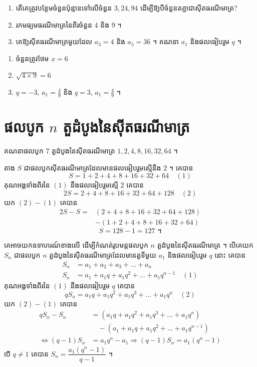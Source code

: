 \begin{pro}
\begin{enumerate}[a]
  \item តើគេត្រូវបន្ថែមចំនួនប៉ុន្មានទៅលើចំនួន $3, 24, 94$ ដើម្បីឱ្យបីចំនួនតគ្នាជាស៊ីតធរណីមាត្រ?
  \item រកមធ្យមធរណីមាត្រនៃពីរចំនួន $4$ និង $9$ ។
  \item គេឱ្យស៊ីតធរណីមាត្រមួយដែល $a_3 = 4$ និង $a_5 = 36$ ។ គណនា $a_1$ និងផលធៀបរួម $q$ ។
\end{enumerate}
\ans
\begin{enumerate}[a]
  \item ចំនួនត្រូវថែម $x = 6$
  \item $\sqrt{4 \times 9} = 6$
  \item $q = -3$, $a_1 = \frac{4}{9}$ និង $q = 3$, $a_1 = \frac{4}{9}$ ។
\end{enumerate}
\end{pro}

\section{ផលបូក \texorpdfstring{$n$}{n} តួដំបូងនៃស៊ីតធរណីមាត្រ}

\begin{example}[ឧទាហរណ៍]
គណនាផលបូក $7$ តួដំបូងនៃស៊ីតធរណីមាត្រ $1, 2, 4, 8, 16, 32, 64$ ។

តាង $S$ ជាផលបូកស៊ីតធរណីមាត្រដែលមានផលធៀបរួមស្មើនឹង $2$ ។ គេបាន
\[ S = 1 + 2 + 4 + 8 + 16 + 32 + 64 \quad (1) \]
គុណអង្គទាំងពីរនៃ $(1)$ នឹងផលធៀបរួមស្មើ $2$ គេបាន
\[ 2S = 2 + 4 + 8 + 16 + 32 + 64 + 128 \quad (2) \]
យក $(2) - (1)$ គេបាន
\[ \begin{aligned} 2S - S = {}&(2 + 4 + 8 + 16 + 32 + 64 + 128)\\ &- (1 + 2 + 4 + 8 + 16 + 32 + 64) \end{aligned} \]
\[ S = 128 - 1 = 127 \text{ ។} \]
\end{example}

គេអាចយកឧទាហរណ៍ខាងលើ ដើម្បីកំណត់រូបមន្តផលបូក $n$ តួដំបូងនៃស៊ីតធរណីមាត្រ ។ បើគេយក $S_n$ ជាផលបូក $n$ តួដំបូងនៃស៊ីតធរណីមាត្រដែលមានតួទីមួយ $a_1$ និងផលធៀបរួម $q$ នោះ គេបាន
\[
\begin{aligned}
S_n &= a_1 + a_2 + a_3 + \ldots + a_n\\
S_n &= a_1 + a_1 q + a_1 q^2 + \ldots + a_1 q^{n-1} \quad (1)
\end{aligned}
\]
គុណអង្គទាំងពីរនៃ $(1)$ នឹងផលធៀបរួម $q$ គេបាន
\[ qS_n = a_1 q + a_1 q^2 + a_1 q^3 + \ldots + a_1 q^n \quad (2) \]
យក $(2) - (1)$ គេបាន
\[
\begin{aligned}
qS_n - S_n &= (a_1 q + a_1 q^2 + a_1 q^3 + \ldots + a_1 q^n)\\ &\quad - (a_1 + a_1 q + a_1 q^2 + \ldots + a_1 q^{n-1})\\
\iff (q - 1)S_n &= a_1 q^n - a_1 \Rightarrow (q - 1)S_n = a_1(q^n - 1)
\end{aligned}
\]
បើ $q \ne 1$ គេបាន $S_n = \dfrac{a_1(q^n - 1)}{q - 1}$ ។

